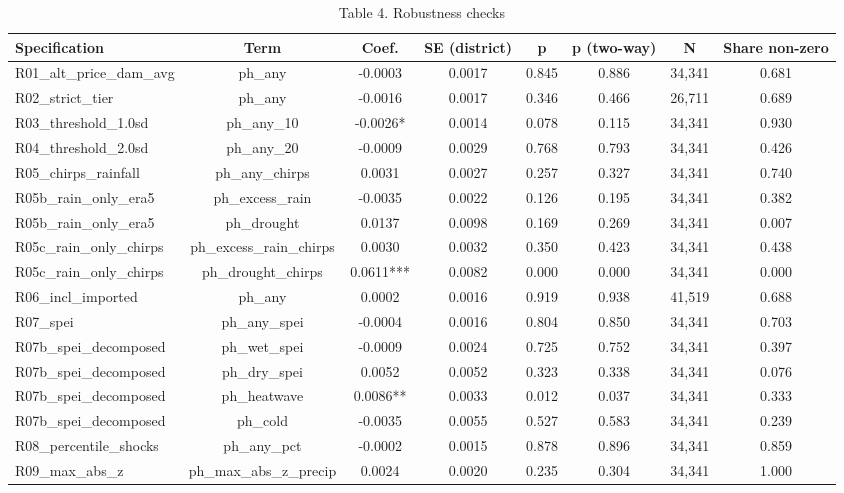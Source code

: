 \begin{table}[htbp]\centering\small
\caption{Table 4. Robustness checks}\label{tab:table4_robustness}
\begin{tabular}{lccccccc}
\toprule
Specification & Term & Coef. & SE (district) & p & p (two-way) & N & Share non-zero \\
\midrule
R01\_alt\_price\_dam\_avg & ph\_any & -0.0003 & 0.0017 & 0.845 & 0.886 & 34,341 & 0.681 \\
R02\_strict\_tier & ph\_any & -0.0016 & 0.0017 & 0.346 & 0.466 & 26,711 & 0.689 \\
R03\_threshold\_1.0sd & ph\_any\_10 & -0.0026* & 0.0014 & 0.078 & 0.115 & 34,341 & 0.930 \\
R04\_threshold\_2.0sd & ph\_any\_20 & -0.0009 & 0.0029 & 0.768 & 0.793 & 34,341 & 0.426 \\
R05\_chirps\_rainfall & ph\_any\_chirps & 0.0031 & 0.0027 & 0.257 & 0.327 & 34,341 & 0.740 \\
R05b\_rain\_only\_era5 & ph\_excess\_rain & -0.0035 & 0.0022 & 0.126 & 0.195 & 34,341 & 0.382 \\
R05b\_rain\_only\_era5 & ph\_drought & 0.0137 & 0.0098 & 0.169 & 0.269 & 34,341 & 0.007 \\
R05c\_rain\_only\_chirps & ph\_excess\_rain\_chirps & 0.0030 & 0.0032 & 0.350 & 0.423 & 34,341 & 0.438 \\
R05c\_rain\_only\_chirps & ph\_drought\_chirps & 0.0611*** & 0.0082 & 0.000 & 0.000 & 34,341 & 0.000 \\
R06\_incl\_imported & ph\_any & 0.0002 & 0.0016 & 0.919 & 0.938 & 41,519 & 0.688 \\
R07\_spei & ph\_any\_spei & -0.0004 & 0.0016 & 0.804 & 0.850 & 34,341 & 0.703 \\
R07b\_spei\_decomposed & ph\_wet\_spei & -0.0009 & 0.0024 & 0.725 & 0.752 & 34,341 & 0.397 \\
R07b\_spei\_decomposed & ph\_dry\_spei & 0.0052 & 0.0052 & 0.323 & 0.338 & 34,341 & 0.076 \\
R07b\_spei\_decomposed & ph\_heatwave & 0.0086** & 0.0033 & 0.012 & 0.037 & 34,341 & 0.333 \\
R07b\_spei\_decomposed & ph\_cold & -0.0035 & 0.0055 & 0.527 & 0.583 & 34,341 & 0.239 \\
R08\_percentile\_shocks & ph\_any\_pct & -0.0002 & 0.0015 & 0.878 & 0.896 & 34,341 & 0.859 \\
R09\_max\_abs\_z & ph\_max\_abs\_z\_precip & 0.0024 & 0.0020 & 0.235 & 0.304 & 34,341 & 1.000 \\

\end{tabular}
\end{table}
